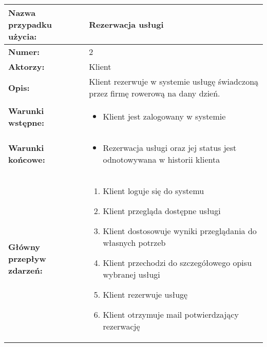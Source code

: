 \documentclass[a4paper,20pt]{article}
\begin{document}
\begin{center}
\begin{tabularx}{\textwidth}[t]{XX}

\arrayrulecolor{black}\hline
\textbf{Nazwa przypadku użycia:} & \textbf{Rezerwacja usługi} \\
\hline

\quad \textbf{Numer:} & 
\begin{minipage}[t]{\linewidth}%
2
\end{minipage}\\


\quad \textbf{Aktorzy:} & 
\begin{minipage}[t]{\linewidth}%
Klient
\end{minipage}\\


\quad \textbf{Opis:} & 
\begin{minipage}[t]{\linewidth}%
Klient rezerwuje w systemie usługę świadczoną przez firmę rowerową na dany dzień. 
\end{minipage}\\


\quad \textbf{Warunki wstępne:} & 
\begin{minipage}[t]{\linewidth}%
\begin{itemize}
\item Klient jest zalogowany w systemie
\end{itemize}
\end{minipage}\\


\quad \textbf{Warunki końcowe:} & 
\begin{minipage}[t]{\linewidth}%
\begin{itemize}
\item Rezerwacja usługi oraz jej status jest odnotowywana w historii klienta
\end{itemize}
\end{minipage}\\


\quad \textbf{Główny przepływ zdarzeń:} & 
\begin{minipage}[t]{\linewidth}%
\begin{enumerate}
\item Klient loguje się do systemu
\item Klient przegląda dostępne usługi
\item Klient dostosowuje wyniki przeglądania do własnych potrzeb
\item Klient przechodzi do szczegółowego opisu wybranej usługi
\item Klient rezerwuje usługę
\item Klient otrzymuje mail potwierdzający rezerwację
\end{enumerate}
\end{minipage}\\



\end{tabularx}
\end{center}
\end{document}
